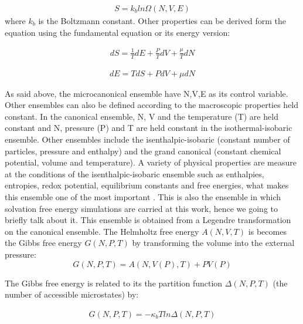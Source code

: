 \begin{equation}
\begin{aligned}
S = k_{b} ln \Omega (N,V,E) 
\end{aligned}
\end{equation}
where $k_{b}$ is the Boltzmann constant. Other properties can be derived form the equation using the fundamental equation or its energy version:

\begin{equation}
\begin{aligned}
dS = \frac{1}{T} dE + \frac{P}{T} dV + \frac{\mu}{T} dN
\end{aligned}
\end{equation}

\begin{equation}
\begin{aligned}
dE = T dS + P dV + \mu dN
\end{aligned}
\end{equation}

As said above, the microcanonical ensemble  have  N,V,E as its control variable. Other ensembles can also be defined according to the macroscopic properties held constant.  In the canonical ensemble,  N, V and the temperature (T) are held constant and  N, pressure (P) and T are held constant in the isothermal-isobaric ensemble. Other ensembles include the isenthalpic-isobaric (constant number of particles, pressure and enthalpy) and the grand canonical (constant chemical potential, volume and temperature). A variety of physical properties are measure at the conditions of the isenthalpic-isobaric ensemble such as enthalpies, entropies, redox potential, equilibrium constants and free energies, what makes this ensemble one of the most important \cite{tuckerman}. This is also the ensemble in which solvation free energy simulations are carried at this work, hence we going to briefly talk about it. This ensemble is obtained from a Legendre transformation on the canonical ensemble. The Helmholtz free energy $A(N,V,T)$ is becomes the Gibbs free energy $G(N,P,T)$ by transforming the volume into the external pressure:
\begin{equation}
G(N,P,T) = A(N,V(P),T) + PV(P)
\end{equation}


The Gibbs free energy is related to its the partition function $\Delta (N,P,T)$ (the number of accessible microstates) by:

\begin{equation}
\label{eq:fisobari}
\begin{aligned}
G(N,P,T) = -\kappa_{b}T ln \Delta (N,P,T)
\end{aligned}
\end{equation}

